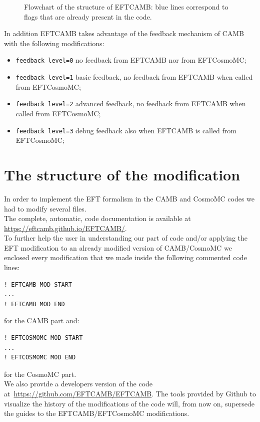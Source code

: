 \documentclass[prd,nofootinbib,showpacs]{revtex4}
\begin{document}
{\begin{figure}[!tp]
\begin{center}
 \caption{\label{Fig:StructureFlowChart} Flowchart of the structure of EFTCAMB: blue lines correspond to flags that are already present in the code.} 
\end{center}
\end{figure}
%
In addition EFTCAMB takes advantage of the feedback mechanism of CAMB with the following modifications:
\begin{itemize}
\item \texttt{feedback level=0} no feedback from EFTCAMB nor from EFTCosmoMC;
\item \texttt{feedback level=1} basic feedback, no feedback from EFTCAMB when called from EFTCosmoMC;
\item \texttt{feedback level=2} advanced feedback, no feedback from EFTCAMB when called from EFTCosmoMC;
\item \texttt{feedback level=3} debug feedback also when EFTCAMB is called from EFTCosmoMC;
\end{itemize}

\section{The structure of the modification}\label{Sec:ModStruct}
%
In order to implement the EFT formalism in the CAMB and CosmoMC codes we had to modify several files. \\
The complete, automatic, code documentation is available at \url{https://eftcamb.github.io/EFTCAMB/}. \\
To further help the user in understanding our part of code and/or applying the EFT modification to an already modified version of CAMB/CosmoMC we enclosed every modification that we made inside the following commented code lines:
%
\begin{verbatim}
! EFTCAMB MOD START
...
! EFTCAMB MOD END
\end{verbatim}
for the CAMB part and:
\begin{verbatim}
! EFTCOSMOMC MOD START
...
! EFTCOSMOMC MOD END
\end{verbatim}
for the CosmoMC part.\\
%

We also provide a developers version of the code at~\url{https://github.com/EFTCAMB/EFTCAMB}.
The tools provided by Github to visualize the history of the modifications of the code will, from now on, supersede the guides to the EFTCAMB/EFTCosmoMC modifications.

}
\end{document}
